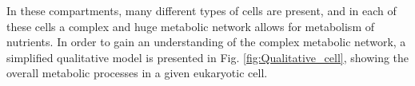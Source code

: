 \documentclass{IEEEtran}
\begin{document}





In these compartments, many different types of cells are present, and in each of these cells a complex and huge metabolic network allows for metabolism of nutrients. In order to gain an understanding of the complex metabolic network, a simplified qualitative model is presented in Fig. \ref{fig:Qualitative_cell}, showing the overall metabolic processes in a given eukaryotic cell.
\end{document}
